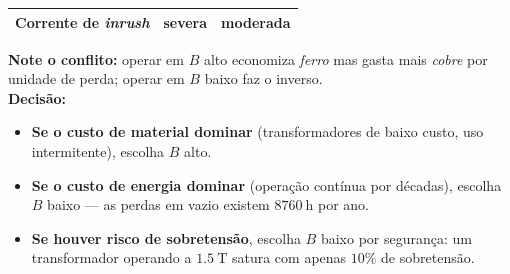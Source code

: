\begin{questao}[4]{}
{\begin{center}
\begin{tabular}{lcc}
Corrente de \emph{inrush} & severa & moderada\\
\hline
\end{tabular}
\end{center}
\textbf{Note o conflito:} operar em $B$ alto economiza \emph{ferro} mas gasta
mais \emph{cobre} por unidade de perda; operar em $B$ baixo faz o inverso.\\
\textbf{Decisão:}
\begin{itemize}
\item \textbf{Se o custo de material dominar} (transformadores de baixo custo,
uso intermitente), escolha $B$ alto.
\item \textbf{Se o custo de energia dominar} (operação contínua por décadas),
escolha $B$ baixo --- as perdas em vazio existem $\SI{8760}{\hour}$ por ano.
\item \textbf{Se houver risco de sobretensão}, escolha $B$ baixo por segurança:
um transformador operando a $\SI{1.5}{\tesla}$ satura com apenas $10\%$ de
sobretensão.
\end{itemize}}
\end{questao}

